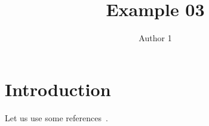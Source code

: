 \documentclass{article}
\title{Example 03}
\author{Author 1}
\begin{document}
\maketitle

\section{Introduction}
Let us use some references~\cite{Jackson,Moore}.

\printbibliography
\end{document}
